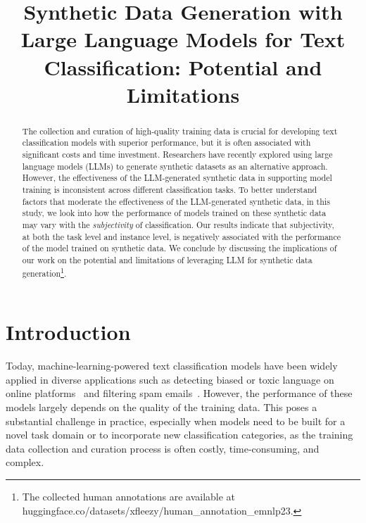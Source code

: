 \title{Synthetic Data Generation with Large Language Models for Text Classification: Potential and Limitations}



\maketitle
\begin{abstract}
The collection and curation of high-quality training data is crucial for developing text classification models with superior performance, but it is often associated with significant costs and time investment. 
Researchers have recently explored using large language models (LLMs) to generate synthetic datasets as an alternative approach. However, the effectiveness of the LLM-generated synthetic data in supporting model training is inconsistent across different classification tasks. 
To better understand factors that moderate the effectiveness of the LLM-generated synthetic data, in this study, we look into how the performance of models trained on these synthetic data may vary with the {\em subjectivity} of classification. 
Our results indicate that subjectivity, at both the task level and instance level, is negatively associated with the performance of the model trained on synthetic data.  
We conclude by discussing the implications of our work on the potential and limitations of leveraging LLM for synthetic data generation\footnote{The collected human annotations are available at \\huggingface.co/datasets/xfleezy/human\_annotation\_emnlp23.}. 
\end{abstract}

\section{Introduction}
Today, machine-learning-powered text classification models have been widely applied in diverse applications such as detecting biased or toxic language on online platforms~\cite{wiegand2019detection} and filtering spam emails~\cite{jindal2007review}. However, the performance of these models largely depends on the quality of the training data. This poses a substantial challenge in practice, especially when models need to be built for a novel task domain or to incorporate new classification categories, as the training data collection and curation process is often costly, time-consuming, and complex. 

